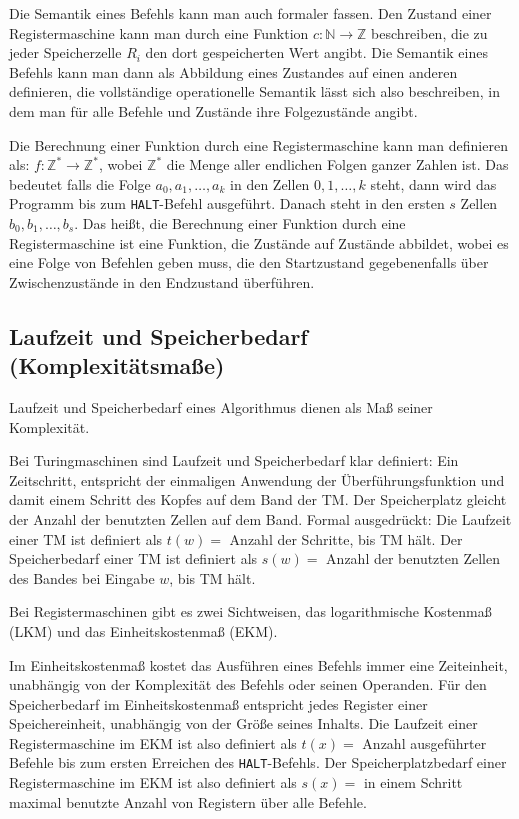 Die Semantik eines Befehls kann man auch formaler fassen. Den Zustand einer Registermaschine kann man durch eine Funktion $c : \mathbb{N} \to \mathbb{Z}$ beschreiben, die zu jeder Speicherzelle $R_i$ den dort gespeicherten Wert angibt. Die Semantik eines Befehls kann man dann als Abbildung eines Zustandes auf einen anderen definieren, die vollständige operationelle Semantik lässt sich also beschreiben, in dem man für alle Befehle und Zustände ihre Folgezustände angibt.

\begin{Def}
\hspace{\parindent}Die Berechnung einer Funktion durch eine Registermaschine kann man definieren als: $f : \mathbb{Z}^* \to \mathbb{Z}^*$, wobei $\mathbb{Z}^*$ die Menge aller endlichen Folgen ganzer Zahlen ist. Das bedeutet falls die Folge $a_0, a_1, \ldots, a_k$ in den Zellen $0, 1, \ldots, k$ steht, dann wird das Programm bis zum \texttt{HALT}-Befehl ausgeführt. Danach steht in den ersten $s$ Zellen $b_0, b_1, \ldots, b_s$. Das heißt, die Berechnung einer Funktion durch eine Registermaschine ist eine Funktion, die Zustände auf Zustände abbildet, wobei es eine Folge von Befehlen geben muss, die den Startzustand gegebenenfalls über Zwischenzustände in den Endzustand überführen.
\end{Def}

\subsection{Laufzeit und Speicherbedarf (Komplexitätsmaße)}
Laufzeit und Speicherbedarf eines Algorithmus dienen als Maß seiner Komplexität.

Bei Turingmaschinen sind Laufzeit und Speicherbedarf klar definiert: Ein Zeitschritt, entspricht der einmaligen Anwendung der Überführungsfunktion und damit einem Schritt des Kopfes auf dem Band der TM. Der Speicherplatz gleicht der Anzahl der benutzten Zellen auf dem Band. Formal ausgedrückt: Die Laufzeit einer TM ist definiert als $t(w) = $ Anzahl der Schritte, bis TM hält. Der Speicherbedarf einer TM ist definiert als $s(w) = $ Anzahl der benutzten Zellen des Bandes bei Eingabe $w$, bis TM hält.

Bei Registermaschinen gibt es zwei Sichtweisen, das logarithmische Kostenmaß (LKM) und das Einheitskostenmaß (EKM).

\begin{Def}\label{defEKM}
\hspace{\parindent}Im Einheitskostenmaß kostet das Ausführen eines Befehls immer eine Zeiteinheit, unabhängig von der Komplexität des Befehls oder seinen Operanden. Für den Speicherbedarf im Einheitskostenmaß entspricht jedes Register einer Speichereinheit, unabhängig von der Größe seines Inhalts. Die Laufzeit einer Registermaschine im EKM ist also definiert als $t(x) = $ Anzahl ausgeführter Befehle bis zum ersten Erreichen des \texttt{HALT}-Befehls. Der Speicherplatzbedarf einer Registermaschine im EKM ist also definiert als $s(x) =$ in einem Schritt maximal benutzte Anzahl von Registern über alle Befehle.
\end{Def}

